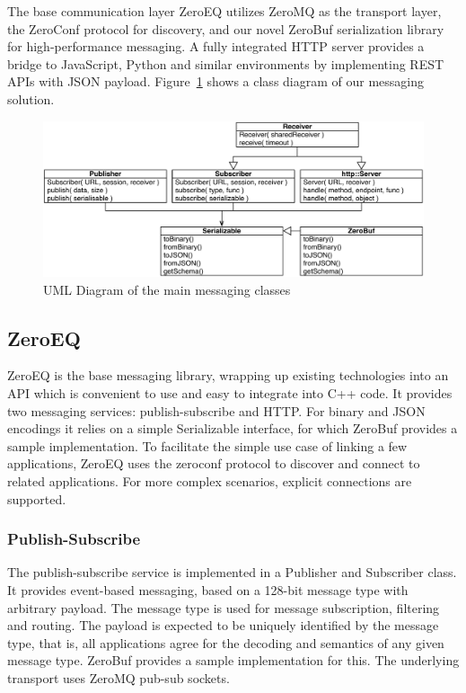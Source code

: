 \documentclass[10pt]{llncs}
\newcommand{\fig}[1]{Figure~\ref{#1}}
\begin{document}
The base communication layer ZeroEQ utilizes ZeroMQ as the transport layer, the
ZeroConf protocol for discovery, and our novel ZeroBuf serialization library for
high-performance messaging. A fully integrated HTTP server provides a bridge to
JavaScript, Python and similar environments by implementing REST APIs with JSON
payload. \fig{fUML} shows a class diagram of our messaging solution.

\begin{figure}[ht]\center
  \includegraphics[width=\columnwidth]{images/ZeroMSUML}
  \caption{\label{fUML}UML Diagram of the main messaging classes}
\end{figure}

\subsection{ZeroEQ}

ZeroEQ is the base messaging library, wrapping up existing technologies into an
API which is convenient to use and easy to integrate into C++ code. It provides
two messaging services: publish-subscribe and HTTP. For binary and JSON
encodings it relies on a simple \textsf{Serializable} interface, for which
ZeroBuf provides a sample implementation. To facilitate the simple use case of
linking a few applications, ZeroEQ uses the zeroconf protocol to discover and
connect to related applications. For more complex scenarios, explicit
connections are supported.

\subsubsection{Publish-Subscribe}

The publish-subscribe service is implemented in a \textsf{Publisher} and
\textsf{Subscriber} class. It provides event-based messaging, based on a 128-bit
message type with arbitrary payload. The message type is used for message
subscription, filtering and routing. The payload is expected to be uniquely
identified by the message type, that is, all applications agree for the decoding
and semantics of any given message type. ZeroBuf provides a sample
implementation for this. The underlying transport uses ZeroMQ pub-sub sockets.
\end{document}
